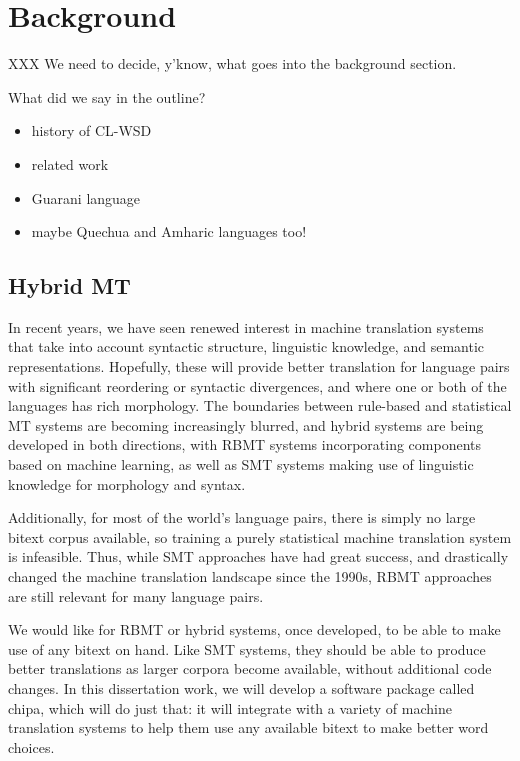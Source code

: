 \chapter{Background}
\label{chap:background}

XXX We need to decide, y'know, what goes into the background section.

What did we say in the outline?

\begin{itemize}
\item history of CL-WSD
\item related work
\item Guarani language
\item maybe Quechua and Amharic languages too!
\end{itemize}


\section{Hybrid MT}

In recent years, we have seen renewed interest in machine translation systems
that take into account syntactic structure, linguistic knowledge, and semantic
representations.
Hopefully, these will provide better translation for language pairs with
significant reordering or syntactic divergences, and where one or both of the
languages has rich morphology.
The boundaries between rule-based and statistical MT systems are becoming
increasingly blurred, and hybrid systems are being developed in both
directions, with RBMT systems incorporating components based on machine
learning, as well as SMT systems making use of linguistic knowledge for
morphology and syntax.



Additionally, for most of the world's language pairs, there is simply no large
bitext corpus available, so training a purely statistical machine translation
system is infeasible.
Thus, while SMT approaches have had great success, and drastically changed the
machine translation landscape since the 1990s, RBMT approaches are still
relevant for many language pairs.

We would like for RBMT or hybrid systems, once developed, to be able to make
use of any bitext on hand.  Like SMT systems, they should be able to produce
better translations as larger corpora become available, without additional code
changes.
In this dissertation work, we will develop a software package called
chipa, which will do just that: %
it will integrate with a variety of machine translation systems to help them
use any available bitext to make better word choices.







